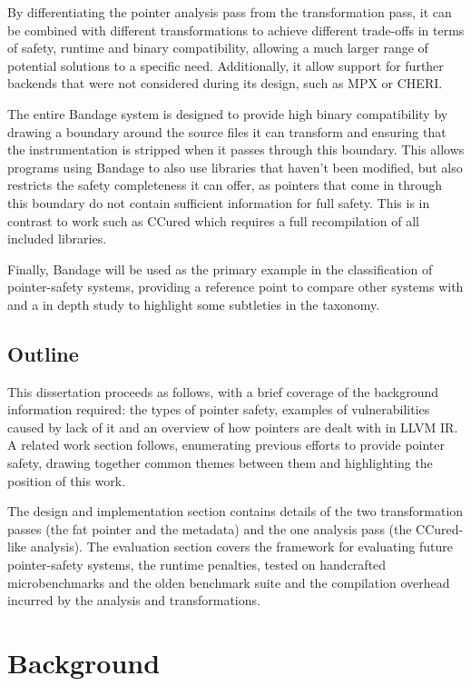 \documentclass[a4paper,12pt,twoside,openright]{report}
\begin{document}
By differentiating the pointer analysis pass from the transformation pass, it can be combined with different transformations to achieve different trade-offs in terms of safety, runtime and binary compatibility, allowing a much larger range of potential solutions to a specific need.
Additionally, it allow support for further backends that were not considered during its design, such as MPX or CHERI.

The entire Bandage system is designed to provide high binary compatibility by drawing a boundary around the source files it can transform and ensuring that the instrumentation is stripped when it passes through this boundary.
This allows programs using Bandage to also use libraries that haven't been modified, but also restricts the safety completeness it can offer, as pointers that come in through this boundary do not contain sufficient information for full safety.
This is in contrast to work such as CCured which requires a full recompilation of all included libraries.

Finally, Bandage will be used as the primary example in the classification of pointer-safety systems, providing a reference point to compare other systems with and a in depth study to highlight some subtleties in the taxonomy.

\section{Outline}

This dissertation proceeds as follows, with a brief coverage of the background information required: the types of pointer safety, examples of vulnerabilities caused by lack of it and an overview of how pointers are dealt with in LLVM IR.
A related work section follows, enumerating previous efforts to provide pointer safety, drawing together common themes between them and highlighting the position of this work.

The design and implementation section contains details of the two transformation passes (the fat pointer and the metadata) and the one analysis pass (the CCured-like analysis).
The evaluation section covers the framework for evaluating future pointer-safety systems, the runtime penalties, tested on handcrafted microbenchmarks and the olden benchmark suite and the compilation overhead incurred by the analysis and transformations.

\chapter{Background} 

\end{document}
